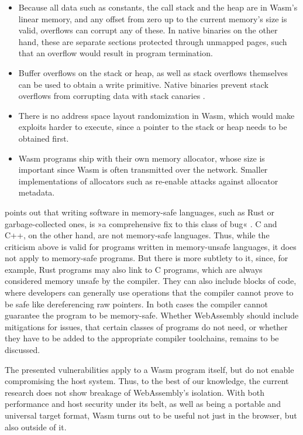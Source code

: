 \begin{itemize}
    \item Because all data such as constants, the call stack and the heap are in Wasm's linear memory, and any offset from zero up to the current memory's size is valid, overflows can corrupt any of these. In native binaries on the other hand, these are separate sections protected through unmapped pages, such that an overflow would result in program termination.
    \item Buffer overflows on the stack or heap, as well as stack overflows themselves can be used to obtain a write primitive. Native binaries prevent stack overflows from corrupting data with stack canaries \cite{Cowan98}.
    \item There is no address space layout randomization in Wasm, which would make exploits harder to execute, since a pointer to the stack or heap needs to be obtained first.
    \item Wasm programs ship with their own memory allocator, whose size is important since Wasm is often transmitted over the network. Smaller implementations of allocators such as  re-enable attacks against allocator metadata.
\end{itemize}

\citeauthor{Wingo2020} points out that writing software in memory-safe languages, such as Rust or garbage-collected ones, is »a comprehensive fix to this class of bug« \cite{Wingo2020}. C and C++, on the other hand, are not memory-safe languages. Thus, while the criticism above is valid for programs written in memory-unsafe languages, it does not apply to memory-safe programs. But there is more subtlety to it, since, for example, Rust programs may also link to C programs, which are always considered memory unsafe by the compiler. They can also include blocks of  code, where developers can generally use operations that the compiler cannot prove to be safe like dereferencing raw pointers. In both cases the compiler cannot guarantee the program to be memory-safe. Whether WebAssembly should include mitigations for issues, that certain classes of programs do not need, or whether they have to be added to the appropriate compiler toolchains, remains to be discussed.

The presented vulnerabilities apply to a Wasm program itself, but do not enable compromising the host system. Thus, to the best of our knowledge, the current research does not show breakage of WebAssembly's isolation. With both performance and host security under its belt, as well as being a portable and universal target format, Wasm turns out to be useful not just in the browser, but also outside of it.


